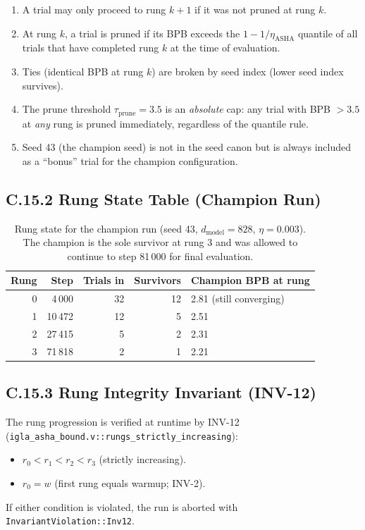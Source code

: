 \begin{enumerate}
  \item A trial may only proceed to rung $k+1$ if it was not pruned
        at rung $k$.
  \item At rung $k$, a trial is pruned if its BPB exceeds the
        $1 - 1/\eta_{\text{ASHA}}$ quantile of all trials that have
        completed rung $k$ at the time of evaluation.
  \item Ties (identical BPB at rung $k$) are broken by seed index
        (lower seed index survives).
  \item The prune threshold $\tau_{\text{prune}} = 3.5$ is an
        \emph{absolute} cap: any trial with BPB $> 3.5$ at \emph{any}
        rung is pruned immediately, regardless of the quantile rule.
  \item Seed 43 (the champion seed) is not in the seed canon but is
        always included as a ``bonus'' trial for the champion
        configuration.
\end{enumerate}

\subsection*{C.15.2 Rung State Table (Champion Run)}

\begin{table}[h]
\centering
\begin{tabular}{rrrrl}
\toprule
\textbf{Rung} & \textbf{Step} & \textbf{Trials in} &
\textbf{Survivors} & \textbf{Champion BPB at rung} \\
\midrule
0 & 4\,000  & 32 & 12 & 2.81 (still converging) \\
1 & 10\,472 & 12 &  5 & 2.51 \\
2 & 27\,415 &  5 &  2 & 2.31 \\
3 & 71\,818 &  2 &  1 & 2.21 \\
\bottomrule
\end{tabular}
\caption{Rung state for the champion run (seed 43, $d_\text{model}=828$,
$\eta=0.003$).  The champion is the sole survivor at rung 3 and was
allowed to continue to step 81\,000 for final evaluation.}
\end{table}

\subsection*{C.15.3 Rung Integrity Invariant (INV-12)}

The rung progression is verified at runtime by INV-12
(\texttt{igla\_asha\_bound.v::rungs\_strictly\_increasing}):
\begin{itemize}
  \item $r_0 < r_1 < r_2 < r_3$ (strictly increasing).
  \item $r_0 = w$ (first rung equals warmup; INV-2).
\end{itemize}
If either condition is violated, the run is aborted with
\texttt{InvariantViolation::Inv12}.

